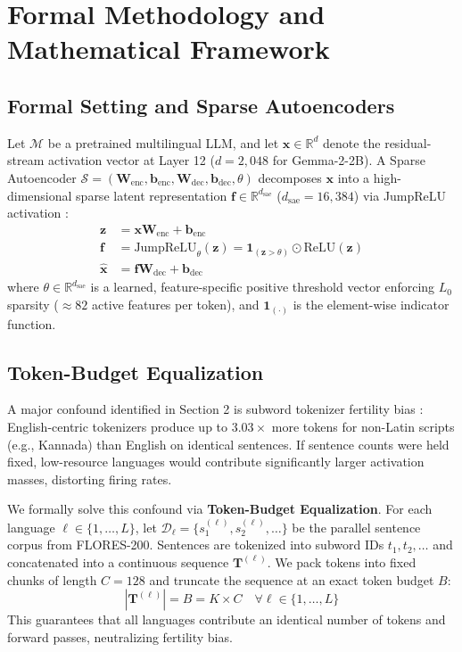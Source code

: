\documentclass[11pt]{article}
\begin{document}
\section{Formal Methodology and Mathematical Framework}

\subsection{Formal Setting and Sparse Autoencoders}
Let $\mathcal{M}$ be a pretrained multilingual LLM, and let $\mathbf{x} \in \mathbb{R}^{d}$ denote the residual-stream activation vector at Layer 12 ($d = 2,048$ for Gemma-2-2B). A Sparse Autoencoder $\mathcal{S} = (\mathbf{W}_{\text{enc}}, \mathbf{b}_{\text{enc}}, \mathbf{W}_{\text{dec}}, \mathbf{b}_{\text{dec}}, \theta)$ decomposes $\mathbf{x}$ into a high-dimensional sparse latent representation $\mathbf{f} \in \mathbb{R}^{d_{\text{sae}}}$ ($d_{\text{sae}} = 16,384$) via JumpReLU activation \citep{lieberum2024gemma}:
\begin{align}
\mathbf{z} &= \mathbf{x}\mathbf{W}_{\text{enc}} + \mathbf{b}_{\text{enc}} \\
\mathbf{f} &= \text{JumpReLU}_{\theta}(\mathbf{z}) = \mathbf{1}_{(\mathbf{z} > \theta)} \odot \text{ReLU}(\mathbf{z}) \\
\hat{\mathbf{x}} &= \mathbf{f}\mathbf{W}_{\text{dec}} + \mathbf{b}_{\text{dec}}
\end{align}
where $\theta \in \mathbb{R}^{d_{\text{sae}}}$ is a learned, feature-specific positive threshold vector enforcing $L_0$ sparsity ($\approx 82$ active features per token), and $\mathbf{1}_{(\cdot)}$ is the element-wise indicator function.

\subsection{Token-Budget Equalization}
A major confound identified in Section 2 is subword tokenizer fertility bias \citep{srivastava2026tokenizer, lundin2026token}: English-centric tokenizers produce up to $3.03\times$ more tokens for non-Latin scripts (e.g., Kannada) than English on identical sentences. If sentence counts were held fixed, low-resource languages would contribute significantly larger activation masses, distorting firing rates.

We formally solve this confound via \textbf{Token-Budget Equalization}. For each language $\ell \in \{1, \dots, L\}$, let $\mathcal{D}_\ell = \{s_1^{(\ell)}, s_2^{(\ell)}, \dots\}$ be the parallel sentence corpus from FLORES-200. Sentences are tokenized into subword IDs $t_1, t_2, \dots$ and concatenated into a continuous sequence $\mathbf{T}^{(\ell)}$. We pack tokens into fixed chunks of length $C = 128$ and truncate the sequence at an exact token budget $B$:
\begin{equation}
|\mathbf{T}^{(\ell)}| = B = K \times C \quad \forall \ell \in \{1, \dots, L\}
\end{equation}
This guarantees that all languages contribute an identical number of tokens and forward passes, neutralizing fertility bias.
\end{document}
